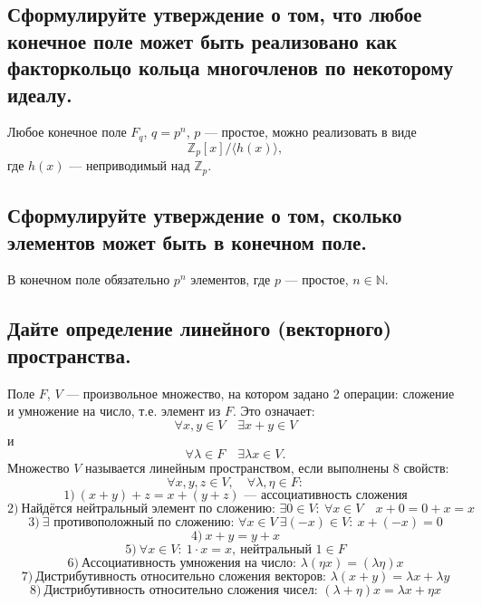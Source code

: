 \subsection{Сформулируйте утверждение о том, что любое конечное поле может быть реализовано как факторкольцо кольца многочленов по некоторому идеалу.}

\begin{theorem}
    Любое конечное поле $F_q$, $q = p^n$, $p$ --- простое, можно реализовать в виде
    \[
        \mathbb{Z}_p[x] / \langle h(x) \rangle,
    \]
    где $h(x)$ --- неприводимый над $\mathbb{Z}_p$.
\end{theorem}


\subsection{Сформулируйте утверждение о том, сколько элементов может быть в конечном поле.}

\begin{theorem}
    В конечном поле обязательно $p^n$ элементов, где $p$ --- простое, $n \in \mathbb{N}$.
\end{theorem}


\subsection{Дайте определение линейного (векторного) пространства.}

\begin{definition}
    Поле $F$, $V$ --- произвольное множество, на котором задано 2 операции: сложение и умножение на число, т.е. элемент из $F$. Это означает:
    \[
        \forall x, y \in V\quad \exists x + y \in V
    \]
    и
    \[
        \forall \lambda \in F\quad \exists \lambda x \in V.
    \]
    Множество $V$ называется линейным пространством, если выполнены 8 свойств:
    \[
        \forall x, y, z \in V,\quad \forall \lambda, \eta \in F:
    \]
    \[
        1)\ (x + y) + z = x + (y + z) \text{ --- ассоциативность сложения}
    \]
    \[
        2)\ \text{Найдётся нейтральный элемент по сложению: } \exists 0 \in V:\ \forall x \in V\quad x + 0 = 0 + x = x
    \]
    \[
        3)\ \exists \text{ противоположный по сложению: } \forall x \in V\ \exists (-x) \in V:\ x + (-x) = 0
    \]
    \[
        4)\ x + y = y + x
    \]
    \[
        5)\ \forall x \in V:\ 1 \cdot x = x,\ \text{нейтральный } 1 \in F
    \]
    \[
        6)\ \text{Ассоциативность умножения на число: } \lambda(\eta x) = (\lambda \eta)x
    \]
    \[
        7)\ \text{Дистрибутивность относительно сложения векторов: } \lambda(x + y) = \lambda x + \lambda y
    \]
    \[
        8)\ \text{Дистрибутивность относительно сложения чисел: } (\lambda + \eta)x = \lambda x + \eta x
    \]
\end{definition}


